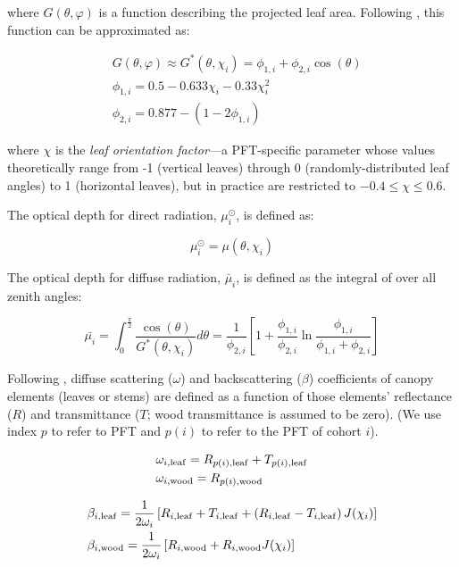 where $G(\theta, \varphi)$ is a function describing the projected leaf area.
Following \citet{goudriaan_1977_crop}, this function can be approximated as:

\begin{align}
  & G(\theta, \varphi) \approx G^*(\theta, \chi_{i}) = \phi_{1, i} + \phi_{2, i} \cos(\theta) \label{eqn:gfunction} \\
  & \phi_{1, i} = 0.5 - 0.633 \chi_{i} - 0.33 \chi_{i}^{2} \\
  & \phi_{2, i} = 0.877 - \left( 1 - 2 \phi_{1, i} \right)
\end{align}

where $\chi$ is the \emph{leaf orientation factor}---a PFT-specific parameter whose values theoretically range from -1 (vertical leaves) through 0 (randomly-distributed leaf angles) to 1 (horizontal leaves), but in practice are restricted to $-0.4 \leq \chi \leq 0.6$.

The optical depth for direct radiation, $\mu^{\odot}_{i}$, is defined as:

\begin{equation}
  \mu^{\odot}_{i} = \mu(\theta, \chi_{i})
\end{equation}

The optical depth for diffuse radiation, $\bar{\mu}_{i}$, is defined as the integral of \label{eqn:opticaldepth} over all zenith angles:

\begin{equation}
  \bar{\mu_{i}} = \int_{0}^{\frac{\pi}{2}} \frac{\cos(\theta)}{G^{*}(\theta, \chi_{i})} d\theta
  = \frac{1}{\phi_{2,i}} \left[ 1 + \frac{\phi_{1, i}}{\phi_{2, i}} \ln \frac{\phi_{1, i}}{\phi_{1, i} + \phi_{2, i}} \right]
\end{equation}

Following \citet{sellers1985canopy}, diffuse scattering ($\omega$) and backscattering ($\beta$) coefficients of canopy elements (leaves or stems) are defined as a function of those elements' reflectance ($R$) and transmittance ($T$; wood transmittance is assumed to be zero).
(We use index $p$ to refer to PFT and $p(i)$ to refer to the PFT of cohort $i$).

\begin{align}
  & \omega_{i, \mathrm{leaf}} = R_{p(i), \mathrm{leaf}} + T_{p(i), \mathrm{leaf}}\\
  & \omega_{i, \mathrm{wood}} = R_{p(i), \mathrm{wood}}
\end{align}

\begin{align}
  & \beta_{i, \mathrm{leaf}} = \frac{1}{2 \omega_{i}} \left[R_{i, \mathrm{leaf}} + T_{i, \mathrm{leaf}} + \left( R_{i, \mathrm{leaf}} - T_{i, \mathrm{leaf}} \right) J(\chi_{i}) \right] \\
  & \beta_{i, \mathrm{wood}} = \frac{1}{2 \omega_{i}} \left[R_{i, \mathrm{wood}} +  R_{i, \mathrm{wood}} J(\chi_{i}) \right]
\end{align}

